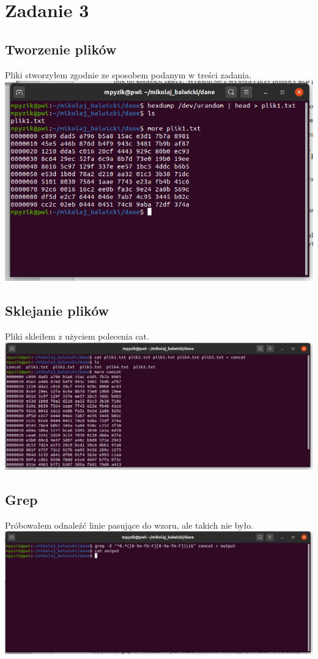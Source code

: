 \documentclass[a4paper,11pt]{article}
\begin{document}
\section{Zadanie 3}
\subsection{Tworzenie plików}
Pliki stworzyłem zgodnie ze sposobem podanym w treści zadania.\\
\includegraphics[width=\textwidth]{tworzenie_plikow.png}

\subsection{Sklejanie plików}
Pliki skleiłem z użyciem polecenia cat.\\
\includegraphics[width=\textwidth]{concat.png}

\subsection{Grep}
Próbowałem odnaleźć linie pasujące do wzoru, ale takich nie było.\\
\includegraphics[width=\textwidth]{grep.png}
\end{document}
